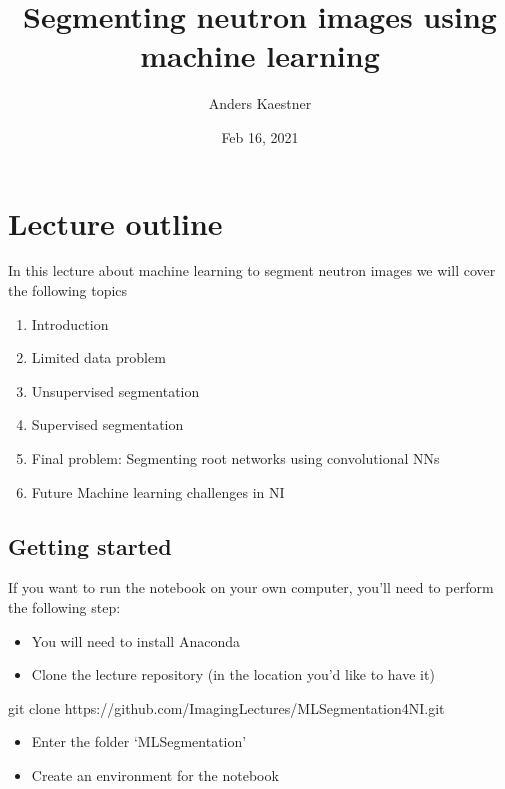 \documentclass[letterpaper,10pt,english]{sphinxmanual}
\title{Segmenting neutron images using machine learning}
\date{Feb 16, 2021}
\author{Anders Kaestner}
\begin{document}
\pagestyle{empty}
\sphinxmaketitle
\pagestyle{plain}
\sphinxtableofcontents
\pagestyle{normal}
\label{\detokenize{ML4NeutronImageSegmentation::doc}}





\chapter{Lecture outline}
\label{\detokenize{ML4NeutronImageSegmentation:lecture-outline}}
In this lecture about machine learning to segment neutron images we will cover the following topics
\begin{enumerate}
%
\item {} 
Introduction

\item {} 
Limited data problem

\item {} 
Unsupervised segmentation

\item {} 
Supervised segmentation

\item {} 
Final problem: Segmenting root networks using convolutional NNs

\item {} 
Future Machine learning challenges in NI

\end{enumerate}


\section{Getting started}
\label{\detokenize{ML4NeutronImageSegmentation:getting-started}}
If you want to run the notebook on your own computer, you’ll need to perform the following step:
\begin{itemize}
\item {} 
You will need to install Anaconda

\item {} 
Clone the lecture repository (in the location you’d like to have it)

\end{itemize}

\begin{sphinxVerbatim}[commandchars=\\\{\}]
git clone https://github.com/ImagingLectures/MLSegmentation4NI.git
\end{sphinxVerbatim}
\begin{itemize}
\item {} 
Enter the folder ‘MLSegmentation’

\item {} 
Create an environment for the notebook

\end{itemize}
\end{document}

